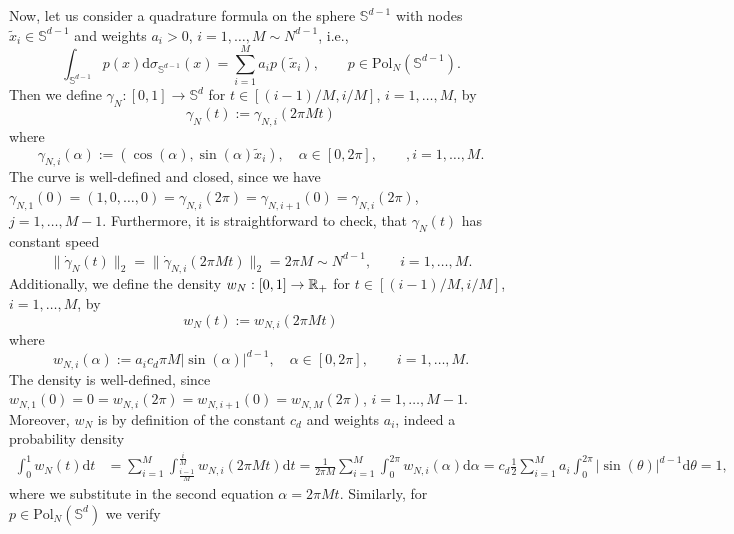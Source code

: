 \documentclass[%
a4paper,11pt,DIV=11,%
abstract=on%
]{scrartcl}
\newcommand{\R}{\ensuremath{\mathbb{R}}}
\begin{document}
Now, let us consider a quadrature formula on the sphere $\mathbb S^{d-1}$ with  nodes  $\tilde x_{i} \in \mathbb S^{d-1}$ and weights $a_{i} > 0$, $i=1,\dots, M \sim N^{d-1}$, i.e.,
\[
  \int_{\mathbb S^{d-1}} p(x) \mathrm d \sigma_{\mathbb S^{d-1}}(x) = \sum_{i=1}^{M} a_{i} p(\tilde x_{i}), \qquad p \in \mathrm{Pol}_{N}(\mathbb S^{d-1}).   
\]
Then we define $\gamma_{N}:[0,1]\to\mathbb S^{d}$ for $t \in [(i-1)/M,i/M]$, $i=1,\dots,M$, by
\[
  \gamma_{N}(t) := \gamma_{N,i}(2\pi M t) 
\]
where
\[
  \gamma_{N,i}(\alpha) := (\cos(\alpha), \sin(\alpha) \tilde x_{i}), \quad \alpha \in [0,2\pi],\qquad ,i=1,\dots,M.
\]
The curve is well-defined and closed, since we have $\gamma_{N,1}(0) = (1,0,\dots,0) = \gamma_{N,i}(2\pi)  = \gamma_{N,i+1}(0) = \gamma_{N,i}(2\pi)$, $j=1,\dots,M-1$.  Furthermore, it is straightforward to check, that $\gamma_{N}(t)$ has constant speed
\[
 \| \dot \gamma_{N}(t)\|_{2} = \| \dot \gamma_{N,i}(2 \pi M t)\|_{2}  =2\pi M \sim N^{d-1}, \qquad i=1,\dots,M.
\]
Additionally, we define the density $w_{N}:[0,1]\to \mathbb \R_{+}$  for $t \in [(i-1)/M,i/M]$, $i=1,\dots,M$, by
\[
  w_{N}(t) := w_{N,i}(2\pi M t) 
\]
where
\[
  w_{N,i}(\alpha) := a_{i} c_{d}  \pi  M|\sin(\alpha)|^{d-1}, \quad \alpha \in [0,2\pi],\qquad i=1,\dots,M.
\]
The density is well-defined, since $w_{N,1}(0) = 0 = w_{N,i}(2\pi) = w_{N,i+1}(0) = w_{N,M}(2\pi)$, $i=1,\dots,M-1$. Moreover, $w_{N}$ is by definition of the constant $c_{d}$ and weights $a_{i}$, indeed a probability density
\[
  \begin{aligned}
    \int_{0}^{1} w_{N}(t) \mathrm d t &  = \sum_{i=1}^{M} \int_{\frac{i-1}{M}}^{\frac{i}{M}}  w_{N,i}(2\pi M t) \mathrm d t =
    \frac{1}{2\pi M}  \sum_{i=1}^{M} \int_{0}^{2\pi}  w_{N,i}(\alpha) \mathrm d \alpha = 
   c_{d} \frac{1}{2} \sum_{i=1}^{M} a_{i} \int_{0}^{2\pi}  |\sin(\theta)|^{d-1} \mathrm d \theta = 1,
   \end{aligned}
 \]
 where we substitute in the second equation $\alpha =2 \pi M t$. Similarly, for $p \in \mathrm{Pol}_{N}(\mathbb S^{d})$ we verify 
\end{document}
